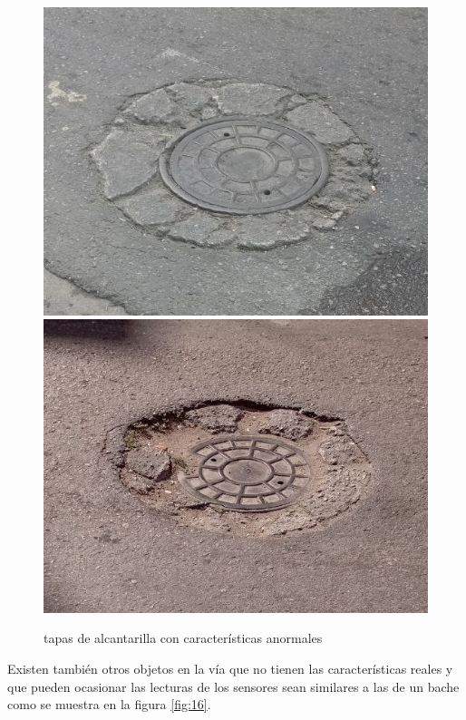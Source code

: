 		\begin{figure}[htb]
			\centering
			\includegraphics[scale = 0.3]{Graphics/pothole_4.jpg}
			\includegraphics[scale = 0.3]{Graphics/pothole_5.jpg}
			\caption{tapas de alcantarilla con características anormales}
			\label{fig:15}
		\end{figure}

		Existen también otros objetos en la vía que no tienen las características reales y que pueden ocasionar las lecturas de los sensores sean similares
		a las de un bache como se muestra en la figura \ref{fig:16}.


